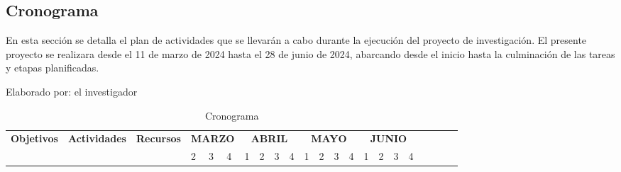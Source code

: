\begin{landscape}
    \section{Cronograma}
    En esta sección se detalla el plan de actividades que se llevarán a cabo durante la ejecución del proyecto de
    investigación. El presente proyecto se realizara desde el 11 de marzo de 2024 hasta el 28 de junio de 2024,
    abarcando desde el inicio hasta la culminación de las tareas y etapas planificadas.
    \begin{ThreePartTable}
        \begin{TableNotes}[flushleft]
            \centering
            \item Elaborado por: el investigador
        \end{TableNotes}
        \begin{longtable}{|p{}|p{5.5cm}|p{4cm}|l|l|l|l|l|l|l|l|l|l|l|l|l|l|l|l|l|l|l|}
            \caption{Cronograma}
            \label{table:cronograma}                                                                                                                                                                                                                                                                                                                                                                                                                                                                                                                                                                                                               \\
            \hline
            \multirow{2}{*}{\bfseries Objetivos}                                & \multirow{2}{*}{\bfseries Actividades}                              & \multirow{2}{*}{\bfseries Recursos}                            & \multicolumn{3}{|c|}{\bfseries MARZO} & \multicolumn{4}{|c|}{\bfseries ABRIL} & \multicolumn{4}{|c|}{\bfseries MAYO} & \multicolumn{4}{|c|}{\bfseries JUNIO}                                                                                                                                                                                                                                                              \\
            \cline{4-21}
                                                                                &                                                                     &                                                                & 2                                     & 3                                     & 4                                    & 1                                     & 2                    & 3                    & 4                    & 1                    & 2                    & 3                    & 4                    & 1                    & 2                    & 3                    & 4                    \\

\end{longtable}
\end{ThreePartTable}
\end{landscape}
